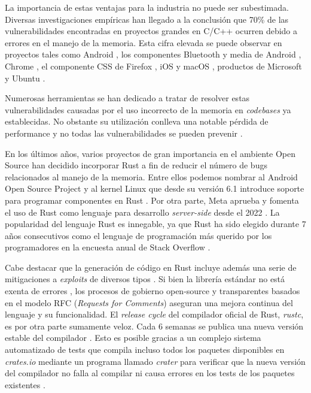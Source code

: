 \documentclass[12pt]{article}
\begin{document}
La importancia de estas ventajas para la industria no puede ser subestimada.
Diversas investigaciones empíricas han llegado a la conclusión que 70\% de las vulnerabilidades
encontradas en proyectos grandes en C/C++ ocurren debido a errores en el manejo de la memoria.
Esta cifra elevada se puede observar en proyectos tales como Android \cite{memory-bugs-android},
los componentes Bluetooth y media de Android \cite{memory-bugs-android-media-bluetooth},
Chrome \cite{memory-bugs-chrome}, el componente CSS de Firefox \cite{memory-bugs-firefox},
iOS y macOS \cite{memory-bugs-ios-macos}, productos de Microsoft \cite{miller-security-microsoft2019, memory-bugs-microsoft}
y Ubuntu \cite{memory-bugs-ubuntu}.

Numerosas herramientas se han dedicado a tratar de resolver estas vulnerabilidades causadas por el uso incorrecto de la memoria en \textit{codebases} ya establecidas.
No obstante su utilización conlleva una notable pérdida de performance y no todas las vulnerabilidades se pueden prevenir \cite{szekeres2013}.

En los últimos años, varios proyectos de gran importancia en el ambiente Open Source han decidido incorporar Rust
a fin de reducir el número de bugs relacionados al manejo de la memoria.
Entre ellos podemos nombrar al Android Open Source Project \cite{android-rust} y
al kernel Linux que desde su versión 6.1 introduce soporte para programar componentes en Rust \cite{infoq-linux-6.1-rust, lwn-linux-6.1-rust}.
Por otra parte, Meta aprueba y fomenta el uso de Rust como lenguaje para desarrollo \textit{server-side} desde el 2022 \cite{meta-rust-server-side}.
La popularidad del lenguaje Rust es innegable, ya que Rust ha sido elegido durante 7 años consecutivos
como el lenguaje de programación más querido por los programadores en la encuesta anual de Stack Overflow \cite{so-survey2022}.

Cabe destacar que la generación de código en Rust incluye además una serie de mitigaciones a \textit{exploits} de diversos tipos \cite[Cap. 11]{rustc-book}.
Si bien la librería estándar no está exenta de errores \cite{davidoff2018},
los procesos de gobierno open-source y transparentes basados en el modelo RFC (\textit{Requests for Comments}) \cite{rust-rfcs}
aseguran una mejora continua del lenguaje y su funcionalidad.
El \textit{release cycle} del compilador oficial de Rust, \textit{rustc}, es por otra parte sumamente veloz.
Cada 6 semanas se publica una nueva versión estable del compilador \cite[Appendix G]{rust-book}.
Esto es posible gracias a un complejo sistema automatizado de tests que compila incluso todos los paquetes disponibles en \textit{crates.io}
mediante un programa llamado \textit{crater} para verificar que
la nueva versión del compilador no falla al compilar ni causa errores en los tests de los paquetes existentes \cite{albini2019}.
\end{document}
